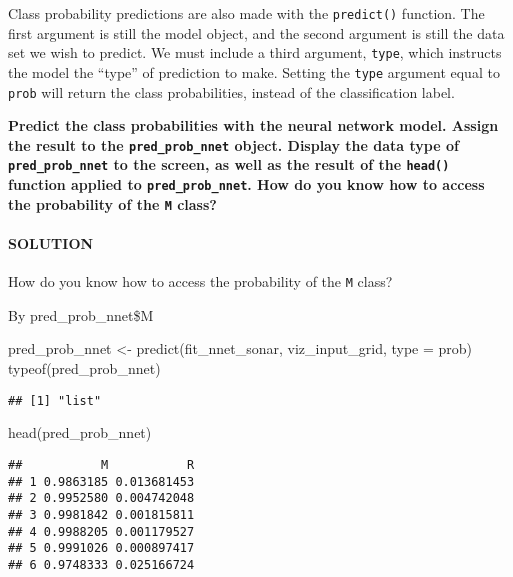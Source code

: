 \documentclass[
]{article}
\newenvironment{Shaded}{\begin{snugshade}}{\end{snugshade}}
\newcommand{\AttributeTok}[1]{\textcolor[rgb]{0.77,0.63,0.00}{#1}}
\newcommand{\FunctionTok}[1]{\textcolor[rgb]{0.00,0.00,0.00}{#1}}
\newcommand{\NormalTok}[1]{#1}
\newcommand{\OtherTok}[1]{\textcolor[rgb]{0.56,0.35,0.01}{#1}}
\newcommand{\StringTok}[1]{\textcolor[rgb]{0.31,0.60,0.02}{#1}}
\begin{document}
Class probability predictions are also made with the \texttt{predict()}
function. The first argument is still the model object, and the second
argument is still the data set we wish to predict. We must include a
third argument, \texttt{type}, which instructs the model the ``type'' of
prediction to make. Setting the \texttt{type} argument equal to
\texttt{\textquotesingle{}prob\textquotesingle{}} will return the class
probabilities, instead of the classification label.

\textbf{Predict the class probabilities with the neural network model.
Assign the result to the \texttt{pred\_prob\_nnet} object. Display the
data type of \texttt{pred\_prob\_nnet} to the screen, as well as the
result of the \texttt{head()} function applied to
\texttt{pred\_prob\_nnet}. How do you know how to access the probability
of the \texttt{\textquotesingle{}M\textquotesingle{}} class?}

\hypertarget{solution-15}{%
\paragraph{SOLUTION}\label{solution-15}}

How do you know how to access the probability of the
\texttt{\textquotesingle{}M\textquotesingle{}} class?

By pred\_prob\_nnet\$M

\begin{Shaded}
\begin{Highlighting}[]
\NormalTok{pred\_prob\_nnet }\OtherTok{\textless{}{-}} \FunctionTok{predict}\NormalTok{(fit\_nnet\_sonar, viz\_input\_grid, }\AttributeTok{type =} \StringTok{\textquotesingle{}prob\textquotesingle{}}\NormalTok{)}
\FunctionTok{typeof}\NormalTok{(pred\_prob\_nnet)}
\end{Highlighting}
\end{Shaded}

\begin{verbatim}
## [1] "list"
\end{verbatim}

\begin{Shaded}
\begin{Highlighting}[]
\FunctionTok{head}\NormalTok{(pred\_prob\_nnet)}
\end{Highlighting}
\end{Shaded}

\begin{verbatim}
##           M           R
## 1 0.9863185 0.013681453
## 2 0.9952580 0.004742048
## 3 0.9981842 0.001815811
## 4 0.9988205 0.001179527
## 5 0.9991026 0.000897417
## 6 0.9748333 0.025166724
\end{verbatim}
\end{document}
